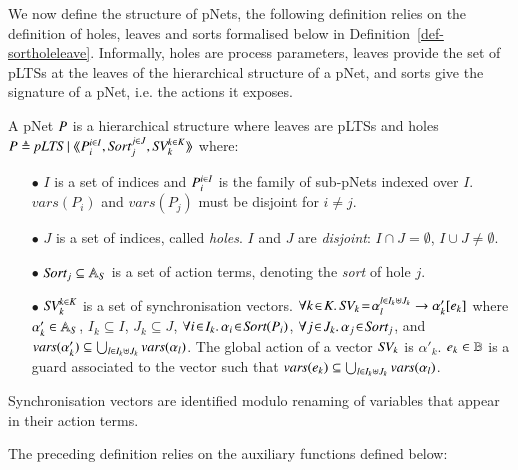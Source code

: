 \documentclass{elsarticle}
\begin{document}
We now define the structure of pNets, the following definition relies on the definition 
of holes, leaves and sorts formalised below in Definition~\ref{def-sortholeleave}. Informally, holes are process parameters, leaves provide the set of pLTSs at the leaves of the hierarchical structure of a pNet, and sorts give the signature of a pNet, i.e. the actions it exposes.

\begin{definition}[pNets]\label{def-pnets}
A pNet $P$ is a hierarchical structure where leaves are pLTSs and holes\\
$\pNet\triangleq \pLTS~|~\mylangle \pNet_i^{i\in I}, \Sort_j^{j\in J}, \symb{SV}_k^{k\in 
K}\myrangle$
where:
\begin{itemize}
\item[$\bullet$] $I$ is a set of indices and $P_i^{i\in I}$ is the family of sub-pNets indexed over $I$. $vars(P_i)$ and $vars(P_j)$ must be disjoint for $i\neq j$.

\item[$\bullet$] $J$ is a set of indices, called \emph{holes}.
$I$ and $J$ are \emph{disjoint}: $I\!\cap\! J=\emptyset$,  $I\!\cup\! J\neq\emptyset$.
\item[$\bullet$] $\Sort_j \subseteq \AlgAS$  is a set of action terms, denoting the 
\emph{sort} of
hole $j$.

\item[$\bullet$] $\symb{SV}_k^{k\in K}$ is a set of
  synchronisation vectors. $\forall k\!\in\! K.\,
  \symb{SV}_k\!=\!\SV{\alpha_{l}^{l\in I_k \uplus J_k}}{\alpha'_k}{e_k}$ where
  $\alpha'_k\in \mathbb{A}_S$, $I_k\subseteq I$, $J_k\subseteq J$,
  $\forall i\!\in\!
  I_k.\,\alpha_{i}\!\in\!\Sort(\pNet_i)$,  $\forall j\!\in\!
  J_k.\,\alpha_{j}\!\in\!\Sort_j$, and $\vars(\alpha'_k)\subseteq \bigcup_{l\in I_k\uplus 
  J_k}{\vars({\alpha_l})}$. The global action of a vector $\symb{SV}_k$ is
$\alpha'_k$. $e_k \in \mathbb{B}$ is a guard associated to the vector such that
$\vars(e_k)\subseteq \bigcup_{l\in I_k\uplus J_k}{\vars({\alpha_l})}$.
\end{itemize}
Synchronisation vectors are identified modulo renaming of variables that appear in their 
action terms.
\end{definition}

The preceding definition relies on the auxiliary functions defined below:
\end{document}

